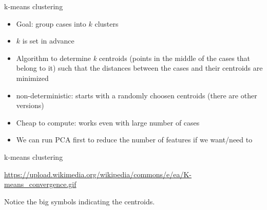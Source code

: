 \documentclass{beamer}
\begin{document}
\begin{frame}{k-means clustering}
\begin{itemize}[<+->]
	\item Goal: group cases into $k$ clusters
	\item $k$ is set in advance
	\item Algorithm to determine \textit{k} centroids (points in the middle of the cases that belong to it) such that the distances between the cases and their centroids are minimized
	\item non-deterministic: starts with a randomly choosen centroids (there are other versions)
	\item Cheap to compute: works even with large number of cases
	\item We can run PCA first to reduce the number of features if we want/need to
\end{itemize}
\end{frame}




\begin{frame}{k-means clustering}

{\tiny{\url{https://upload.wikimedia.org/wikipedia/commons/e/ea/K-means\_convergence.gif}}}

Notice the big symbols indicating the centroids.
\end{frame}
\end{document}
